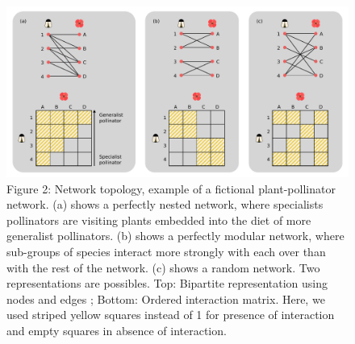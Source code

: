 \documentclass[12pt]{article}
\begin{document}
\begin{no-prefix-figure-caption}

\begin{figure}
\centering
\includegraphics[width=1.00000\textwidth]{Figures/figure2.pdf}
\caption{Figure 2: Network topology, example of a fictional
plant-pollinator network. (a) shows a perfectly nested network, where
specialists pollinators are visiting plants embedded into the diet of
more generalist pollinators. (b) shows a perfectly modular network,
where sub-groups of species interact more strongly with each over than
with the rest of the network. (c) shows a random network. Two
representations are possibles. Top: Bipartite representation using nodes
and edges ; Bottom: Ordered interaction matrix. Here, we used striped
yellow squares instead of 1 for presence of interaction and empty
squares in absence of interaction.}
\end{figure}

\end{no-prefix-figure-caption}
\end{document}
